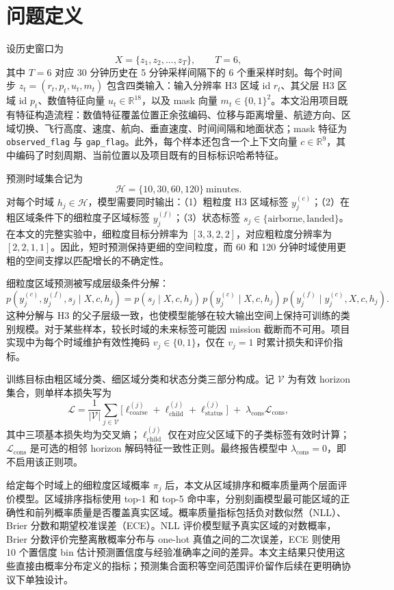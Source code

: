 \section{问题定义}

设历史窗口为
\begin{equation}
X = \{z_1, z_2, \dots, z_T\}, \qquad T = 6,
\end{equation}
其中 $T=6$ 对应 30 分钟历史在 5 分钟采样间隔下的 6 个重采样时刻。每个时间步
$z_t = (r_t, p_t, u_t, m_t)$
包含四类输入：输入分辨率 H3 区域 id $r_t$、其父层 H3 区域 id $p_t$、数值特征向量 $u_t \in \mathbb{R}^{18}$，以及 mask 向量 $m_t \in \{0,1\}^2$。本文沿用项目既有特征构造流程：数值特征覆盖位置正余弦编码、位移与距离增量、航迹方向、区域切换、飞行高度、速度、航向、垂直速度、时间间隔和地面状态；mask 特征为 \texttt{observed\_flag} 与 \texttt{gap\_flag}。此外，每个样本还包含一个上下文向量 $c \in \mathbb{R}^{9}$，其中编码了时刻周期、当前位置以及项目既有的目标标识哈希特征。

预测时域集合记为
\begin{equation}
\mathcal{H} = \{10, 30, 60, 120\}\ \text{minutes}.
\end{equation}
对每个时域 $h_j \in \mathcal{H}$，模型需要同时输出：（1）粗粒度 H3 区域标签 $y_j^{(c)}$；（2）在粗区域条件下的细粒度子区域标签 $y_j^{(f)}$；（3）状态标签 $s_j \in \{\text{airborne}, \text{landed}\}$。在本文的完整实验中，细粒度目标分辨率为 $[3,3,2,2]$，对应粗粒度分辨率为 $[2,2,1,1]$。因此，短时预测保持更细的空间粒度，而 60 和 120 分钟时域使用更粗的空间支撑以匹配增长的不确定性。

细粒度区域预测被写成层级条件分解：
\begin{equation}
p(y_j^{(c)}, y_j^{(f)}, s_j \mid X, c, h_j)
=
p(s_j \mid X, c, h_j)\,
p(y_j^{(c)} \mid X, c, h_j)\,
p(y_j^{(f)} \mid y_j^{(c)}, X, c, h_j).
\end{equation}
这种分解与 H3 的父子层级一致，也使模型能够在较大输出空间上保持可训练的类别规模。对于某些样本，较长时域的未来标签可能因 mission 截断而不可用。项目实现中为每个时域维护有效性掩码 $v_j \in \{0,1\}$，仅在 $v_j=1$ 时累计损失和评价指标。

训练目标由粗区域分类、细区域分类和状态分类三部分构成。记 $\mathcal{V}$ 为有效 horizon 集合，则单样本损失写为
\begin{equation}
\mathcal{L}
=
\frac{1}{|\mathcal{V}|}
\sum_{j \in \mathcal{V}}
\Big[
\ell_{\text{coarse}}^{(j)}
+
\ell_{\text{child}}^{(j)}
+
\ell_{\text{status}}^{(j)}
\Big]
\;+\;
\lambda_{\text{cons}}\mathcal{L}_{\text{cons}},
\end{equation}
其中三项基本损失均为交叉熵；$\ell_{\text{child}}^{(j)}$ 仅在对应父区域下的子类标签有效时计算；$\mathcal{L}_{\text{cons}}$ 是可选的相邻 horizon 解码特征一致性正则。最终报告模型中 $\lambda_{\text{cons}}=0$，即不启用该正则项。

给定每个时域上的细粒度区域概率 $\pi_j$ 后，本文从区域排序和概率质量两个层面评价模型。区域排序指标使用 top-1 和 top-5 命中率，分别刻画模型最可能区域的正确性和前列概率质量是否覆盖真实区域。概率质量指标包括负对数似然（NLL）、Brier 分数和期望校准误差（ECE）。NLL 评价模型赋予真实区域的对数概率，Brier 分数评价完整离散概率分布与 one-hot 真值之间的二次误差，ECE 则使用 10 个置信度 bin 估计预测置信度与经验准确率之间的差异。本文主结果只使用这些直接由概率分布定义的指标；预测集合面积等空间范围评价留作后续在更明确协议下单独设计。
